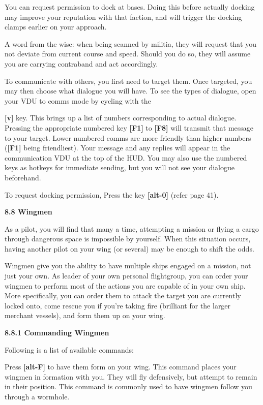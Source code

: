 \documentclass{article}
\begin{document}
You can request permission to dock at bases. Doing this before actually docking may improve your reputation with that faction, and will trigger the docking clamps earlier on your approach. 

A word from the wise: when being scanned by militia, they will request that you not deviate from current course and speed. Should you do so, they will assume you are carrying contraband and act accordingly. 



To communicate with others, you first need to target them. Once targeted, you may then choose what dialogue you will have. To see the types of dialogue, open your VDU to comms mode by cycling with the 

\textbf{[v] }key. This brings up a list of numbers corresponding to actual dialogue. Pressing the appropriate numbered key \textbf{[F1] }to \textbf{[F8] }will transmit that message to your target. Lower numbered comms are more friendly than higher numbers (\textbf{[F1] }being friendliest). Your message and any replies will appear in the communication VDU at the top of the HUD. You may also use the numbered keys as hotkeys for immediate sending, but you will not see your dialogue beforehand. 

To request docking permission, Press the key \textbf{[alt-0]} (refer page 41). 



\textbf{8.8 Wingmen }

As a pilot, you will find that many a time, attempting a mission or flying a cargo through dangerous space is impossible by yourself. When this situation occurs, having another pilot on your wing (or several) may be enough to shift the odds. 

Wingmen give you the ability to have multiple ships engaged on a mission, not just your own. As leader of your own personal flightgroup, you can order your wingmen to perform most of the actions you are capable of in your own ship. More specifically, you can order them to attack the target you are currently locked onto, come rescue you if you're taking fire (brilliant for the larger merchant vessels), and form them up on your wing. 

\textbf{8.8.1 Commanding Wingmen }

Following is a list of available commands: 

Press \textbf{[alt-F]} to have them form on your wing. This command places your wingmen in formation with you. They will fly defensively, but attempt to remain in their position. This command is commonly used to have wingmen follow you through a wormhole. 
\end{document}
